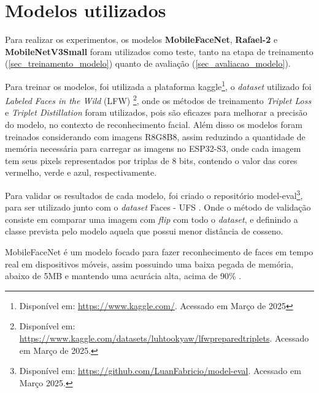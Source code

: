 \section{Modelos utilizados}\label{sec_modelo_utilizado}
Para realizar os experimentos, os modelos \textbf{MobileFaceNet}, \textbf{Rafael-2} e \textbf{MobileNetV3Small}
foram utilizados como teste, tanto na etapa de treinamento (\autoref{sec_treinamento_modelo}) quanto de avaliação
(\autoref{sec_avaliacao_modelo}).

Para treinar os modelos, foi utilizada a plataforma kaggle\footnote{
Disponível em: \url{https://www.kaggle.com/}. Acessado em Março de 2025}, o \textit{dataset} utilizado foi
\textit{Labeled Faces in the Wild} (LFW) \footnote{
Disponível em: \url{https://www.kaggle.com/datasets/luhtookyaw/lfwpreparedtriplets}. Acessado em Março de 2025.},
onde os métodos de treinamento \textit{Triplet Loss} e \textit{Triplet Distillation}
\cite{triplet_distillation_face_recognition} foram utilizados, pois são eficazes para melhorar a precisão do modelo,
no contexto de reconhecimento facial.
Além disso os modelos foram treinados considerando com imagens R8G8B8, assim reduzindo a quantidade de memória necessária
para carregar as imagens no ESP32-S3, onde cada imagem tem seus pixels representados por triplas de 8 bits, contendo o
valor das cores vermelho, verde e azul, respectivamente.

Para validar os resultados de cada modelo, foi criado o repositório model-eval\footnote{
Disponível em: \url{https://github.com/LuanFabricio/model-eval}. Acessado em Março 2025.}, para ser utilizado junto com o
\textit{dataset} Faces - UFS \cite{leandro}.
Onde o método de validação consiste em comparar uma imagem com \textit{flip} com todo o \textit{dataset}, e definindo
a classe prevista pelo modelo aquela que possui menor distância de cosseno.

MobileFaceNet é um modelo focado para fazer reconhecimento de faces em tempo real em dispositivos móveis,
assim possuindo uma baixa pegada de memória, abaixo de 5MB e mantendo uma acurácia alta, acima de 90\% \cite{leandro}.

